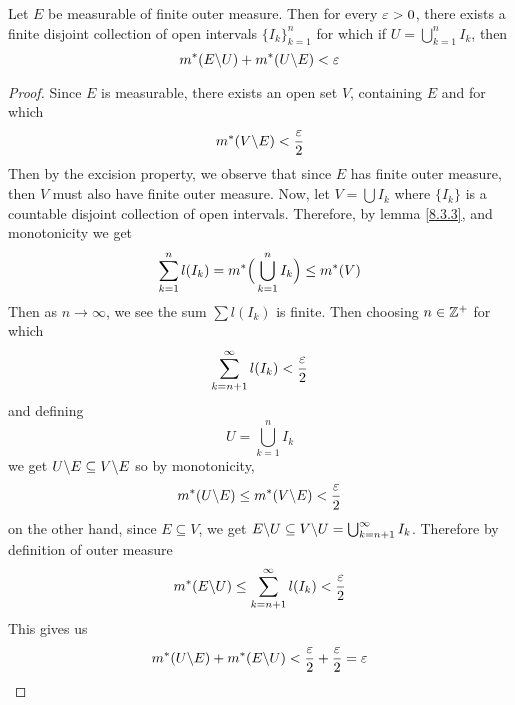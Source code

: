\begin{theorem}\label{8.4.3}
    Let $E$ be measurable of finite outer measure. Then for every  $\varepsilon>0$, there
    exists a finite disjoint collection of open intervals  $\{I_k\}_{k=1}^n$ for
    which if $U=\bigcup_{k=1}^n{I_k}$, then
    \begin{equation*}
        m^\ast(E \backslash U)+m^\ast(U \backslash E)<\varepsilon
    \end{equation*}
\end{theorem}
\begin{proof}
    Since $E$ is measurable, there exists an open set  $V$, containing  $E$ and
    for which
    \begin{equation*}
        m^\ast(V \backslash E)<\frac{\varepsilon}{2}
    \end{equation*}
    Then by the excision property, we observe that since $E$ has finite outer
    measure, then $V$ must also have finite outer measure. Now, let
    $V=\bigcup{I_k}$ where $\{I_k\}$ is a countable disjoint collection of open
    intervals. Therefore, by lemma \ref{8.3.3}, and monotonicity we get
    \begin{equation*}
        \sum_{k=1}^n{l(I_k)}=m^\ast\Big{(} \bigcup_{k=1}^n{I_k} \Big{)} \leq
        m^\ast(V)
    \end{equation*}
    Then as $n \xrightarrow{} \infty$, we see the sum $\sum{l(I_k)}$ is finite.
    Then choosing $n \in \mathbb{Z}^+$ for which
    \begin{equation*}
        \sum_{k=n+1}^{\infty}{l(I_k)}<\frac{\varepsilon}{2}
    \end{equation*}
    and defining
    \begin{equation*}
        U=\bigcup_{k=1}^n{I_k}
    \end{equation*}
    we get $U \backslash E \subseteq V \backslash E$ so by monotonicity,
    \begin{equation*}
        m^\ast(U \backslash E) \leq m^\ast(V \backslash E)<\frac{\varepsilon}{2}
    \end{equation*}
    on the other hand, since $E \subseteq V$, we get  $E \backslash U \subseteq
    V \backslash U=\bigcup_{k=n+1}^\infty{I_k}$. Therefore by definition of outer
    measure
    \begin{equation*}
        m^\ast(E \backslash U) \leq \sum_{k=n+1}^\infty{l(I_k)}<\frac{\varepsilon}{2}
    \end{equation*}
    This gives us
    \begin{equation*}
        m^\ast(U \backslash E)+m^\ast(E \backslash U)<\frac{\varepsilon}{2}+\frac{\varepsilon}{2}=\varepsilon
    \end{equation*}
\end{proof}

